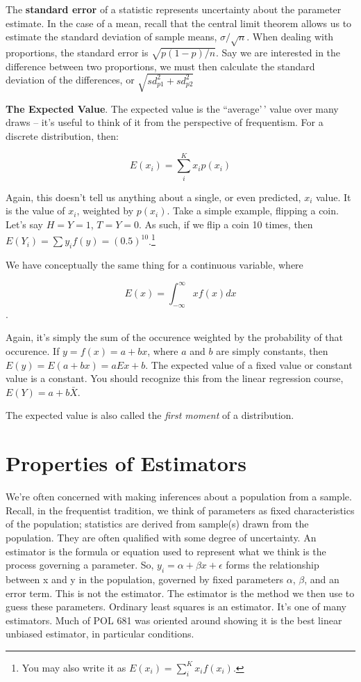 \documentclass[
]{book}
\begin{document}
The \textbf{standard error} of a statistic represents uncertainty about the parameter estimate. In the case of a mean, recall that the central limit theorem allows us to estimate the standard deviation of sample means, \(\sigma/\sqrt{n}\). When dealing with proportions, the standard error is \(\sqrt{p(1-p)/n}\). Say we are interested in the difference between two proportions, we must then calculate the standard deviation of the differences, or \(\sqrt{sd_{p1}^2+sd_{p2}^2}\)

\textbf{The Expected Value}. The expected value is the ``average'\,' value over many draws -- it's useful to think of it from the perspective of frequentism. For a discrete distribution, then:

\[E(x_i)=\sum_{i}^{K} x_i p(x_i)\]

Again, this doesn't tell us anything about a single, or even predicted, \(x_i\) value. It is the value of \(x_i\), weighted by \(p(x_i)\). Take a simple example, flipping a coin. Let's say \(H=Y=1\), \(T=Y=0\). As such, if we flip a coin 10 times, then \(E(Y_i)=\sum y_i  f(y)=(0.5)^{10}\).\footnote{You may also write it as $E(x_i)=\sum_i^{K} x_i f(x_i)$.}

We have conceptually the same thing for a continuous variable, where

\[E(x)=\int_{-\infty}^{\infty}x f(x)dx\].

Again, it's simply the sum of the occurence weighted by the probability of that occurence. If \(y=f(x)=a+bx\), where \(a\) and \(b\) are simply constants, then \(E(y)=E(a+bx)=aEx+b\). The expected value of a fixed value or constant value is a constant. You should recognize this from the linear regression course, \(E(Y)=a+b\bar{X}\).

The expected value is also called the \emph{first moment} of a distribution.

\section{Properties of Estimators}\label{properties-of-estimators}

We're often concerned with making inferences about a population from a sample. Recall, in the frequentist tradition, we think of parameters as fixed characteristics of the population; statistics are derived from sample(s) drawn from the population. They are often qualified with some degree of uncertainty. An estimator is the formula or equation used to represent what we think is the process governing a parameter. So, \(y_i=\alpha+\beta x + \epsilon\) forms the relationship between x and y in the population, governed by fixed parameters \(\alpha\), \(\beta\), and an error term. This is not the estimator. The estimator is the method we then use to guess these parameters. Ordinary least squares is an estimator. It's one of many estimators. Much of POL 681 was oriented around showing it is the best linear unbiased estimator, in particular conditions.
\end{document}
